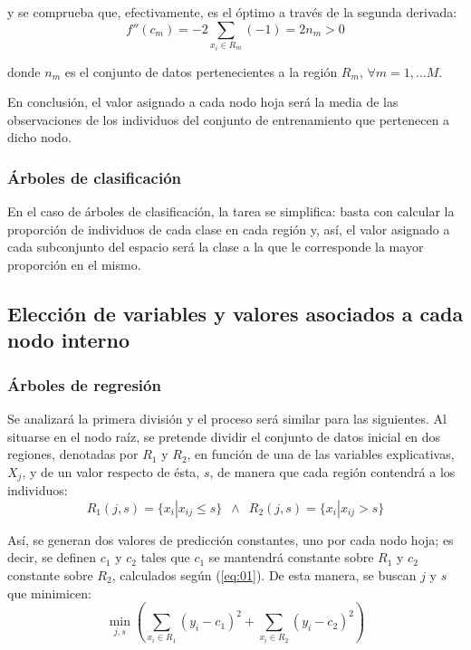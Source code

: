 \documentclass[12pt,twoside]{article}
\begin{document}
\noindent
y se comprueba que, efectivamente, es el óptimo a través de la segunda derivada:
\begin{equation*}
f''(c_m) = -2 \sum_{x_i \in R_m} (-1) = 2n_m > 0
\end{equation*}

\noindent
donde $n_m$ es el conjunto de datos pertenecientes a la región $R_m$, $\forall m = 1,...M$.

En conclusión, el valor asignado a cada nodo hoja será la media de las observaciones de los individuos del conjunto de entrenamiento que pertenecen a dicho nodo.


\subsubsection{Árboles de clasificación}

En el caso de árboles de clasificación, la tarea se simplifica: basta con calcular la proporción de individuos de cada clase en cada región y, así, el valor asignado a cada subconjunto del espacio será la clase a la que le corresponde la mayor proporción en el mismo.


\subsection{Elección de variables y valores asociados a cada nodo interno} \label{sec: subsec22}
\subsubsection{Árboles de regresión}
Se analizará la primera división y el proceso será similar para las siguientes. Al situarse en el nodo raíz, se pretende dividir el conjunto de datos inicial en dos regiones, denotadas por $R_1$ y $R_2$, en función de una de las variables explicativas, $X_j$, y de un valor respecto de ésta, $s$, de manera que cada región contendrá a los individuos:
\begin{equation*}
R_1 (j,s) = \{ x_i | x_{ij} \leq s \} \, \, \, \wedge \, \, \,  R_2 (j,s) = \{ x_{i} | x_{ij} > s\}
\end{equation*}

Así, se generan dos valores de predicción constantes, uno por cada nodo hoja; es decir, se definen $c_1$ y $c_2$ tales que $c_1$ se mantendrá constante sobre $R_1$ y $c_2$ constante sobre $R_2$, calculados según (\ref{eq:01}). De esta manera, se buscan $j$ y $s$ que minimicen:
\begin{equation*}
\min_{j,s} \left( \sum_{x_i \in R_1}(y_i - c_1)^2 + \sum_{x_i \in R_2}(y_i - c_2)^2 \right)
\end{equation*}
\end{document}
